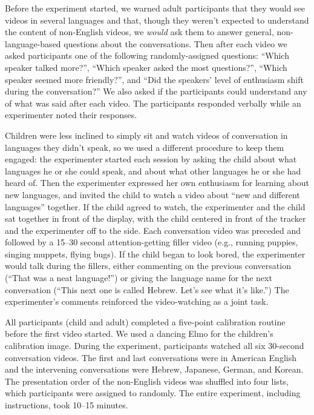 \documentclass[authoryear, 12pt]{elsarticle}
\begin{document}
Before the experiment started, we warned adult participants that they would see videos in several languages and that, though they weren't expected to understand the content of non-English videos, we \textit{would} ask them to answer general, non-language-based questions about the conversations. Then after each video we asked participants one of the following randomly-assigned questions: ``Which speaker talked more?'', ``Which speaker asked the most questions?'', ``Which speaker seemed more friendly?'', and ``Did the speakers' level of enthusiasm shift during the conversation?'' We also asked if the participants could understand any of what was said after each video. The participants responded verbally while an experimenter noted their responses.

Children were less inclined to simply sit and watch videos of conversation in languages they didn't speak, so we used a different procedure to keep them engaged: the experimenter started each session by asking the child about what languages he or she could speak, and about what other languages he or she had heard of. Then the experimenter expressed her own enthusiasm for learning about new languages, and invited the child to watch a video about ``new and different languages'' together. If the child agreed to watch, the experimenter and the child sat together in front of the display, with the child centered in front of the tracker and the experimenter off to the side. Each conversation video was preceded and followed by a 15--30 second attention-getting filler video (e.g., running puppies, singing muppets, flying bugs). If the child began to look bored, the experimenter would talk during the fillers, either commenting on the previous conversation (``That was a neat language!'') or giving the language name for the next conversation (``This next one is called Hebrew. Let's see what it's like.'') The experimenter's comments reinforced the video-watching as a joint task.

All participants (child and adult) completed a five-point calibration routine before the first video started. We used a dancing Elmo for the children's calibration image. During the experiment, participants watched all six 30-second conversation videos. The first and last conversations were in American English and the intervening conversations were Hebrew, Japanese, German, and Korean. The presentation order of the non-English videos was shuffled into four lists, which participants were assigned to randomly. The entire experiment, including instructions, took 10--15 minutes.
\end{document}
